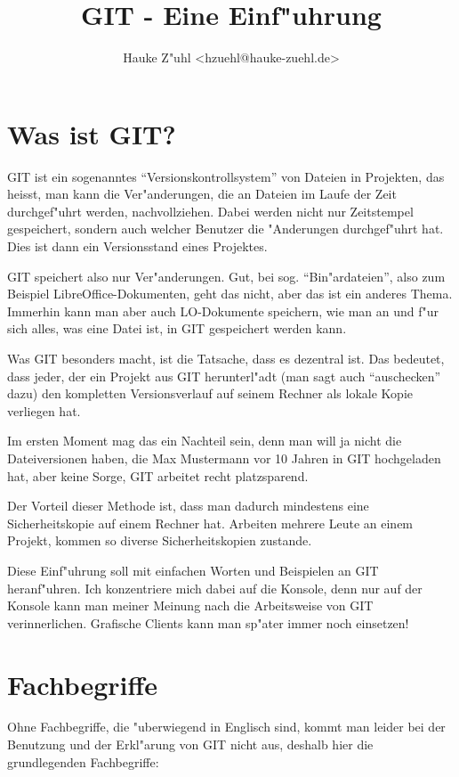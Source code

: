 \documentclass[german,a4paper]{report}
\begin{document}
\title{GIT - Eine Einf"uhrung}
\author{Hauke Z"uhl <hzuehl@hauke-zuehl.de>}

\maketitle

\tableofcontents

\chapter{Was ist GIT?}
GIT ist ein sogenanntes ``Versionskontrollsystem'' von Dateien in Projekten, das heisst,
man kann die Ver"anderungen, die an Dateien im Laufe der Zeit durchgef"uhrt werden,
nachvollziehen. Dabei werden nicht nur Zeitstempel gespeichert, sondern auch welcher
Benutzer die "Anderungen durchgef"uhrt hat. Dies ist dann ein Versionsstand eines
Projektes.

GIT speichert also nur Ver"anderungen. Gut, bei sog. ``Bin"ardateien'', also zum Beispiel
LibreOffice-Dokumenten, geht das nicht, aber das ist ein anderes Thema. Immerhin kann
man aber auch LO-Dokumente speichern, wie man an und f"ur sich alles, was eine Datei ist,
in GIT gespeichert werden kann.

Was GIT besonders macht, ist die Tatsache, dass es dezentral ist. Das bedeutet, dass jeder,
der ein Projekt aus GIT herunterl"adt (man sagt auch ``auschecken'' dazu) den kompletten
Versionsverlauf auf seinem Rechner als lokale Kopie verliegen hat.

Im ersten Moment mag das ein Nachteil sein, denn man will ja nicht die Dateiversionen
haben, die Max Mustermann vor 10 Jahren in GIT hochgeladen hat, aber keine Sorge, GIT
arbeitet recht platzsparend.

Der Vorteil dieser Methode ist, dass man dadurch mindestens eine Sicherheitskopie auf
einem Rechner hat.
Arbeiten mehrere Leute an einem Projekt, kommen so diverse Sicherheitskopien zustande.

Diese Einf"uhrung soll mit einfachen Worten und Beispielen an GIT heranf"uhren. Ich
konzentriere mich dabei auf die Konsole, denn nur auf der Konsole kann man meiner Meinung
nach die Arbeitsweise von GIT verinnerlichen. Grafische Clients kann man sp"ater immer
noch einsetzen!

\chapter{Fachbegriffe}
Ohne Fachbegriffe, die "uberwiegend in Englisch sind, kommt man leider bei der Benutzung
und der Erkl"arung von GIT nicht aus, deshalb hier die grundlegenden Fachbegriffe:
\end{document}
